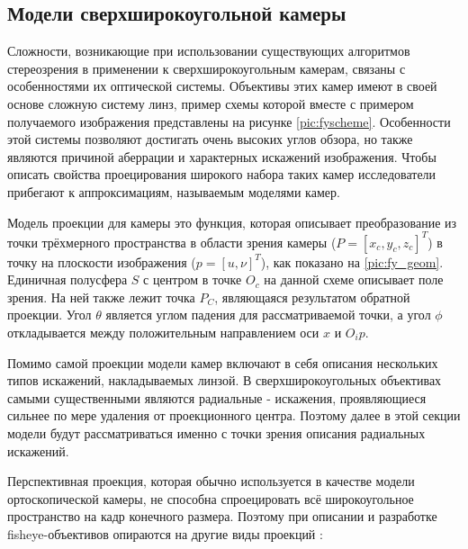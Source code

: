 \subsection{Модели сверхширокоугольной камеры}
\label{camera_model}
Сложности, возникающие при использовании существующих алгоритмов стереозрения  в применении к сверхширокоугольным камерам, связаны с
 особенностями их оптической системы. Объективы  этих камер имеют в своей основе сложную систему линз, пример схемы которой вместе с примером
 получаемого изображения представлены на рисунке \ref{pic:fyscheme}. Особенности этой системы позволяют достигать очень высоких углов обзора,
  но также являются причиной аберрации и характерных искажений изображения. Чтобы описать свойства проецирования широкого набора таких
камер исследователи прибегают к аппроксимациям, называемым моделями камер. 


Модель проекции для камеры это функция, которая описывает преобразование из точки трёхмерного пространства  в области зрения 
камеры ($P=[x_c, y_c, z_c]^T$) в точку на плоскости изображения ($p=[u, \nu]^T$), как показано на \ref{pic:fy_geom}. Единичная            %
полусфера $S$ с центром в точке $O_c$ на данной схеме описывает поле зрения. На ней также лежит точка $P_C$, являющаяся результатом обратной проекции.    %
Угол $\theta$ является углом падения для рассматриваемой точки, а угол $\phi$ откладывается между положительным направлением оси $x$ и $O_{i}{p}$. 

Помимо самой проекции модели камер включают в себя описания нескольких типов искажений, накладываемых линзой. В сверхширокоугольных объективах самыми существенными являются 
радиальные - искажения, проявляющиеся сильнее по мере удаления от проекционного центра. Поэтому далее в этой секции модели будут рассматриваться именно с точки зрения 
описания радиальных искажений. 


Перспективная проекция, которая обычно используется в качестве модели ортоскопической камеры, не способна спроецировать всё широкоугольное пространство на кадр 
конечного размера. Поэтому при описании и разработке fisheye-объективов опираются на другие виды проекций  \cite{projections}:

